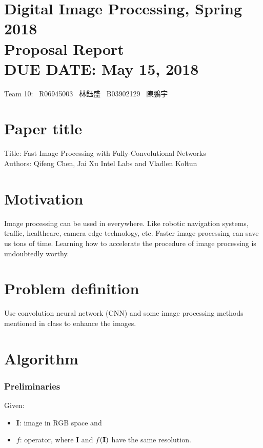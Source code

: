 \documentclass{article}
\newcommand{\hmwkClass}{Digital Image Processing, Spring 2018}
\newcommand{\hmwkTitle}{Proposal Report}
\newcommand{\hmwkDueDate}{May 15, 2018}
\newcommand{\tb}{\textbf}
\begin{document}
\thispagestyle{empty}
\section*{\hmwkClass \\
    \normalsize{\hmwkTitle} \\
    \normalsize{DUE DATE: \hmwkDueDate}
}

\hfill{Team 10: \, R06945003 \, 林鈺盛 \, B03902129 \, 陳鵬宇} \\

\section*{Paper title}

Title: Fast Image Processing with Fully-Convolutional Networks \\
Authors: Qifeng Chen, Jai Xu Intel Labs and Vladlen Koltun

\section*{Motivation}

Image processing can be used in everywhere. Like robotic navigation systems, traffic, healthcare, camera edge technology, etc. Faster image processing can save us tons of time. Learning how to accelerate the procedure of image processing is undoubtedly worthy.

\section*{Problem definition}

Use convolution neural network (CNN) and some image processing methods mentioned in class to enhance the images.

\section*{Algorithm}

\subsubsection*{Preliminaries}

Given:

\begin{itemize}
    \item \tb I: image in RGB space and
    \item $f$: operator, where \tb{I} and $f(\tb I)$ have the same resolution.
\end{itemize}
\end{document}
